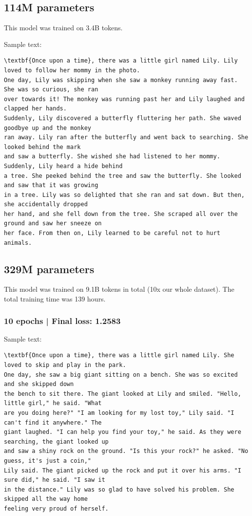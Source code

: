 \documentclass{article}
\begin{document}
\subsection*{114M parameters}

This model was trained on 3.4B tokens.

Sample text: \begin{verbatim}
\textbf{Once upon a time}, there was a little girl named Lily. Lily loved to follow her mommy in the photo.
One day, Lily was skipping when she saw a monkey running away fast. She was so curious, she ran
over towards it! The monkey was running past her and Lily laughed and clapped her hands.
Suddenly, Lily discovered a butterfly fluttering her path. She waved goodbye up and the monkey
ran away. Lily ran after the butterfly and went back to searching. She looked behind the mark
and saw a butterfly. She wished she had listened to her mommy. Suddenly, Lily heard a hide behind
a tree. She peeked behind the tree and saw the butterfly. She looked and saw that it was growing
in a tree. Lily was so delighted that she ran and sat down. But then, she accidentally dropped
her hand, and she fell down from the tree. She scraped all over the ground and saw her sneeze on
her face. From then on, Lily learned to be careful not to hurt animals.
\end{verbatim}


\subsection*{329M parameters}

This model was trained on 9.1B tokens in total (10x our whole dataset).
The total training time was 139 hours.

\subsubsection*{10 epochs | Final loss: 1.2583}

Sample text: \begin{verbatim}
\textbf{Once upon a time}, there was a little girl named Lily. She loved to skip and play in the park.
One day, she saw a big giant sitting on a bench. She was so excited and she skipped down
the bench to sit there. The giant looked at Lily and smiled. "Hello, little girl," he said. "What
are you doing here?" "I am looking for my lost toy," Lily said. "I can't find it anywhere." The
giant laughed. "I can help you find your toy," he said. As they were searching, the giant looked up
and saw a shiny rock on the ground. "Is this your rock?" he asked. "No guess, it's just a coin,"
Lily said. The giant picked up the rock and put it over his arms. "I sure did," he said. "I saw it
in the distance." Lily was so glad to have solved his problem. She skipped all the way home
feeling very proud of herself.
\end{verbatim}
\end{document}
